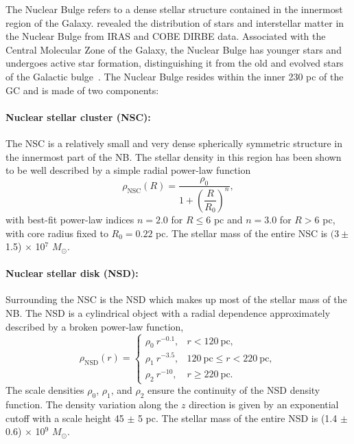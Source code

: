 \documentclass[doublespace,nopageskip]{VTthesis} %
\begin{document}
The Nuclear Bulge refers to a dense stellar structure contained in the innermost region of the Galaxy. \citet{2002A&A...384..112L} revealed the distribution of stars and interstellar matter in the Nuclear Bulge from IRAS and COBE DIRBE data. Associated with the Central Molecular Zone of the Galaxy, the Nuclear Bulge has younger stars and undergoes active star formation, distinguishing it from the old and evolved stars of the Galactic bulge~\cite{2002A&A...384..112L}. 
The Nuclear Bulge resides within the inner 230 pc of the GC and is made of two components:

\paragraph{Nuclear stellar cluster (NSC):} The NSC is a relatively small and very dense spherically symmetric structure in the innermost part of the NB. The stellar density in this region has been shown~\cite{2002A&A...384..112L} to be well described by a simple radial power-law function
\begin{equation}\label{eq:NSC}
  \rho_{\text{NSC}}(R)=\dfrac{\rho_0}{1+\left(\dfrac{R}{R_0}\right)^{n}},
\end{equation}
with best-fit power-law indices $n = 2.0$ for $R \leq 6$ pc and $n = 3.0$ for $R > 6$ pc, with core radius fixed to $R_0 = 0.22$ pc. The stellar mass of the entire NSC is $(3\pm$ 1.5) $\times$ 10$^7$ $M_\odot$.

\paragraph{Nuclear stellar disk (NSD):} Surrounding the NSC is the NSD which makes up most of the stellar mass of the NB. The NSD is a cylindrical object with a radial dependence approximately described by a broken power-law function,
\begin{equation}\label{eq:NSD}
  \rho_{\text{NSD}}(r) = \begin{cases}
    \rho_0\ r^{-0.1}, & r < 120\ \text{pc},\\
    \rho_1\ r^{-3.5}, & 120\ \text{pc} \leq r < 220\ \text{pc},\\
    \rho_2\ r^{-10}, & r \geq 220\ \text{pc}.
  \end{cases}
\end{equation}
The scale densities $\rho_0$, $\rho_1$, and $\rho_2$ ensure the continuity of the NSD density function. The density variation along the $z$ direction is given by an exponential cutoff with a scale height 45 $\pm$ 5 pc. The stellar mass of the entire NSD is (1.4 $\pm$ 0.6) $\times$ 10$^9$ $M_\odot$.
\end{document}
